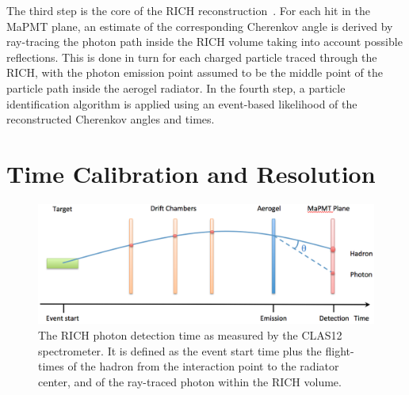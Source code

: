 \documentclass[5p,times,twocolumn]{elsarticle}
\begin{document}
The third step is the core of the RICH reconstruction~\cite{recon-nim}. For each hit in the MaPMT plane, an
estimate of the corresponding Cherenkov angle is derived by ray-tracing the photon path inside the RICH volume
taking into account possible reflections. This is done in turn for each charged particle traced through the RICH, with
the photon emission point assumed to be the middle point of the particle path inside the aerogel radiator. In the fourth
step, a particle identification algorithm is applied using an event-based likelihood of the reconstructed Cherenkov
angles and times.

\section{Time Calibration and Resolution}
\label{sec:TimeCalib}

\begin{figure}[t]
\begin{center}
\includegraphics[width=1.0\columnwidth]{Tracking_time.png}
\end{center}
\caption{The RICH photon detection time as measured by the  CLAS12 spectrometer. It is defined as the event start
  time plus the flight-times of the hadron from the interaction point to the radiator center, and of the ray-traced
  photon within the RICH volume.}
\label{Fig:Traced_Time}
\end{figure}
\end{document}
